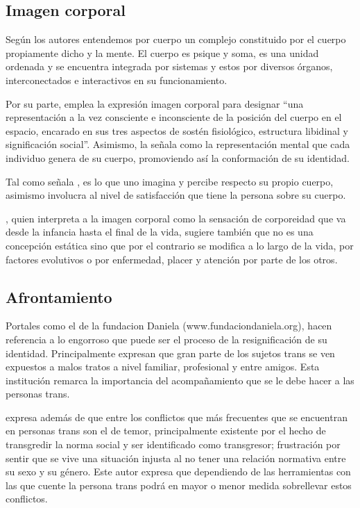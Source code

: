 \subsection{Imagen corporal}

Según los autores \textcite{Kottow2005} entendemos por cuerpo un complejo
constituido por el cuerpo propiamente dicho y la mente. El cuerpo es psique y
soma, es una unidad ordenada y se encuentra integrada por sistemas y estos por
diversos órganos, interconectados e interactivos en su funcionamiento.

Por su parte, \textcite{Schilder1999} emplea la expresión imagen corporal para
designar “una representación a la vez consciente e inconsciente de la posición
del cuerpo en el espacio, encarado en sus tres aspectos de sostén fisiológico,
estructura libidinal y significación social”. Asimismo, la señala como la
representación mental que cada individuo genera de su cuerpo, promoviendo así la
conformación de su identidad.

Tal como señala \textcite{Schilder1999}, es lo que uno imagina y percibe
respecto  su propio cuerpo, asimismo involucra al nivel de satisfacción que
tiene la persona sobre su cuerpo.

\textcite{Rosenbaum1979}, quien interpreta a la imagen corporal como la
sensación de corporeidad que va desde la infancia hasta el final de la vida,
sugiere también que no es una concepción estática sino que por el contrario se
modifica a lo largo de la vida, por factores evolutivos o por enfermedad, placer
y atención por parte de los otros.

\subsection{Afrontamiento}

Portales como el de la fundacion Daniela
(www.fundaciondaniela.org), hacen referencia a lo engorroso que puede ser el
proceso de la resignificación de su identidad. Principalmente expresan que gran
parte de los sujetos trans se ven expuestos a malos tratos a nivel familiar,
profesional y entre amigos. Esta institución remarca la importancia del
acompañamiento que se le debe hacer a las personas trans.

\textcite{Salin-Pascual2008} expresa además de que entre los conflictos que más
frecuentes que se encuentran en personas trans son el de temor, principalmente
existente por el hecho de transgredir la norma social y ser identificado como
transgresor;  frustración por sentir que se vive una situación injusta al no
tener una relación normativa entre su sexo y su género. Este autor expresa que
dependiendo de las herramientas con las que cuente la persona trans podrá en
mayor o menor medida sobrellevar estos conflictos.

